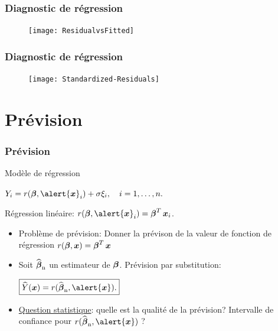 \begin{frame}
\frametitle{Diagnostic de régression}
\begin{figure}
  \centering
  \texttt{[image: ResidualvsFitted]}\\
\end{figure}
\end{frame}


\begin{frame}
\frametitle{Diagnostic de régression}
\begin{figure}
  \centering
  \texttt{[image: Standardized-Residuals]}\\
\end{figure}
\end{frame}












\section{Prévision}

\begin{frame}
\frametitle{Prévision}

Modèle de régression \vspace{2mm} \centerline{$ Y_i=
r(\truebeta, \alert{\bx}_i)+ \sigma \xi_i, \quad i=1,\dots,n.$}
Régression
\alert{linéaire}: $r(\truebeta, \alert{\bx}_i)=\truebeta^T
\bx_i$.
\begin{itemize}
\item \alert{Problème de prévision}:
Donner la prévison de la valeur de fonction de
régression $r(\boldsymbol{\beta},  \operatorname{\boldsymbol{x}})=\boldsymbol{\beta}^T \operatorname{\boldsymbol{x}}$\\
\item Soit $\operatorname{\widehat{\boldsymbol{\beta}}_n}$ un estimateur de $\boldsymbol{\beta}$. \alert{Prévision par
substitution:}
 \centerline{$\boxed{ \widehat Y(\bx) = r(\estregress, \alert{\bx}).}$}
\item \underline{Question statistique}: quelle est la qualité de la prévision?
\alert{Intervalle de confiance} pour $r(\estregress, \alert{\bx})$ ?
\end{itemize}
\end{frame}



